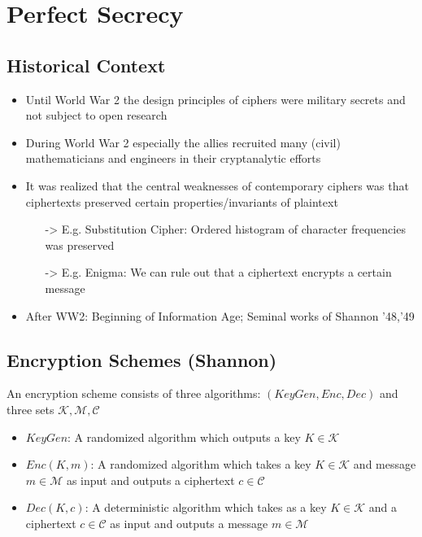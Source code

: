 

\chapter{Perfect Secrecy}


	\section{Historical Context}
		\begin{itemize}
			\item Until World War 2 the design principles of ciphers were military secrets and not subject to open research
			\item During World War 2 especially the allies recruited many (civil) mathematicians and engineers in their cryptanalytic efforts
			\item It was realized that the central weaknesses of contemporary ciphers was that ciphertexts preserved certain properties/invariants of plaintext
			\begin{itemize}
				\item[->] E.g. Substitution Cipher: Ordered histogram of character frequencies was preserved
				\item[->] E.g. Enigma: We can rule out that a ciphertext encrypts a certain message
			\end{itemize}
			\item After WW2: Beginning of Information Age; Seminal works of Shannon ’48,’49
		\end{itemize}
		
	\section{Encryption Schemes (Shannon)}
		An encryption scheme consists of three algorithms: $(KeyGen,Enc,Dec)$ and three sets $\mathcal{K},\mathcal{M},\mathcal{C}$
		\begin{itemize}
			\item $KeyGen$: A randomized algorithm which outputs a key $K \in \mathcal{K}$
			\item $Enc(K,m)$: A randomized algorithm which takes a key $K \in \mathcal{K}$ and message $m \in \mathcal{M}$ as input and outputs a ciphertext $c \in \mathcal{C}$
			\item $Dec(K,c)$: A deterministic algorithm which takes as a key $K \in \mathcal{K}$ and a ciphertext $c \in \mathcal{C}$ as input 
			and outputs a message $m \in \mathcal{M}$
		\end{itemize}
	
